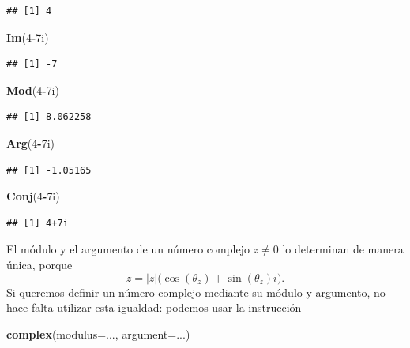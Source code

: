 \documentclass[]{book}
\newenvironment{Shaded}{\begin{snugshade}}{\end{snugshade}}
\newcommand{\DataTypeTok}[1]{\textcolor[rgb]{0.13,0.29,0.53}{#1}}
\newcommand{\DecValTok}[1]{\textcolor[rgb]{0.00,0.00,0.81}{#1}}
\newcommand{\KeywordTok}[1]{\textcolor[rgb]{0.13,0.29,0.53}{\textbf{#1}}}
\newcommand{\NormalTok}[1]{#1}
\newcommand{\OperatorTok}[1]{\textcolor[rgb]{0.81,0.36,0.00}{\textbf{#1}}}
\theoremstyle{definition}
\theoremstyle{definition}
\theoremstyle{definition}
\theoremstyle{remark}
\begin{document}
\begin{verbatim}
## [1] 4
\end{verbatim}

\begin{Shaded}
\begin{Highlighting}[]
\KeywordTok{Im}\NormalTok{(}\DecValTok{4}\OperatorTok{-}\NormalTok{7i)}
\end{Highlighting}
\end{Shaded}

\begin{verbatim}
## [1] -7
\end{verbatim}

\begin{Shaded}
\begin{Highlighting}[]
\KeywordTok{Mod}\NormalTok{(}\DecValTok{4}\OperatorTok{-}\NormalTok{7i)}
\end{Highlighting}
\end{Shaded}

\begin{verbatim}
## [1] 8.062258
\end{verbatim}

\begin{Shaded}
\begin{Highlighting}[]
\KeywordTok{Arg}\NormalTok{(}\DecValTok{4}\OperatorTok{-}\NormalTok{7i)}
\end{Highlighting}
\end{Shaded}

\begin{verbatim}
## [1] -1.05165
\end{verbatim}

\begin{Shaded}
\begin{Highlighting}[]
\KeywordTok{Conj}\NormalTok{(}\DecValTok{4}\OperatorTok{-}\NormalTok{7i)}
\end{Highlighting}
\end{Shaded}

\begin{verbatim}
## [1] 4+7i
\end{verbatim}

El módulo y el argumento de un número complejo \(z\neq 0\) lo determinan de manera única, porque
\[
z=|z|\big(\cos(\theta_z)+\sin(\theta_z)i\big).
\]
Si queremos definir un número complejo mediante su módulo y argumento, no hace falta utilizar esta igualdad: podemos usar la instrucción

\begin{Shaded}
\begin{Highlighting}[]
\KeywordTok{complex}\NormalTok{(}\DataTypeTok{modulus=}\NormalTok{..., }\DataTypeTok{argument=}\NormalTok{...)}
\end{Highlighting}
\end{Shaded}
\end{document}
